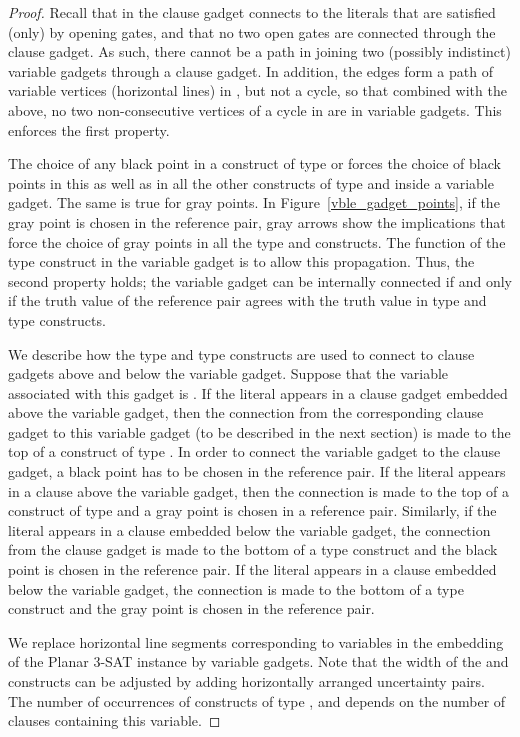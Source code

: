 \begin{proof}
Recall that in  the clause gadget connects to the literals that
are satisfied (only) by opening gates, and that no two open gates are
connected through the clause gadget.  As such, there cannot be a path
in  joining two (possibly indistinct) variable gadgets through a
clause gadget.  In addition, the edges  form a path of variable
vertices (horizontal lines) in , but not a cycle, so that
combined with the above, no two non-consecutive vertices of a cycle in
 are in variable gadgets.  This enforces the first property.

The choice of any black point in a construct of type  or 
forces the choice of black points in this as well as in all the other
constructs of type  and  inside a variable gadget.  The same is
true for gray points.  In Figure~\ref{vble_gadget_points}, if the gray
point is chosen in the reference pair, gray arrows show the
implications that force the choice of gray points in all the type 
and  constructs.  The function of the type  construct in the
variable gadget is to allow this propagation.  Thus, the second
property holds; the variable gadget can be internally connected if and
only if the truth value of the reference pair agrees with the truth
value in type  and type  constructs.







We describe how the type  and type  constructs are used to
connect to clause gadgets above and below the variable gadget.
Suppose that the variable associated with this gadget is .  If the
literal  appears in a clause gadget embedded above the variable
gadget, then the connection from the corresponding clause gadget to
this variable gadget (to be described in the next section) is made to
the top of a construct of type . In order to connect the variable
gadget to the clause gadget, a black point has to be chosen in the
reference pair.  If the literal  appears in a clause
above the variable gadget, then the connection is made to the top of a
construct of type  and a gray point is chosen in a reference
pair. Similarly, if the literal  appears in a clause embedded below
the variable gadget, the connection from the clause gadget is made to
the bottom of a type  construct and the black point is chosen in
the reference pair. If the literal  appears in a clause
embedded below the variable gadget, the connection is made to the
bottom of a type  construct and the gray point is chosen in the
reference pair.

We replace horizontal line segments corresponding to variables in the embedding of the Planar 3-SAT instance by variable gadgets. Note that the width of the  and  constructs can be adjusted by adding horizontally arranged uncertainty pairs.
The number of occurrences of constructs of type ,  and  depends on the number of clauses containing this variable.


\end{proof}
